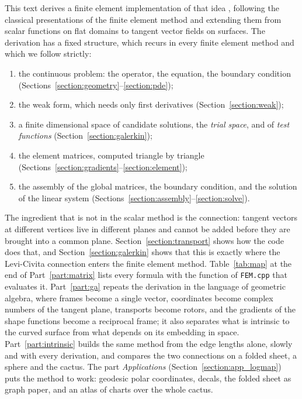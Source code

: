 \documentclass{birkjour}
\numberwithin{equation}{section}
\newcommand{\code}[1]{\texttt{#1}}
\begin{document}
This text derives a finite element implementation of that idea \cite{ConnectionLaplacianFEM}, following the classical presentations of the finite element method \cite{Sayas2015, Langtangen2014} and extending them from scalar functions on flat domains to tangent vector fields on surfaces. The derivation has a fixed structure, which recurs in every finite element method and which we follow strictly:
\begin{enumerate}
\item the continuous problem: the operator, the equation, the boundary condition (Sections~\ref{section:geometry}--\ref{section:pde});
\item the weak form, which needs only first derivatives (Section~\ref{section:weak});
\item a finite dimensional space of candidate solutions, the \emph{trial space}, and of \emph{test functions} (Section~\ref{section:galerkin});
\item the element matrices, computed triangle by triangle (Sections~\ref{section:gradients}--\ref{section:element});
\item the assembly of the global matrices, the boundary condition, and the solution of the linear system (Sections~\ref{section:assembly}--\ref{section:solve}).
\end{enumerate}
The ingredient that is not in the scalar method is the connection: tangent vectors at different vertices live in different planes and cannot be added before they are brought into a common plane. Section~\ref{section:transport} shows how the code does that, and Section~\ref{section:galerkin} shows that this is exactly where the Levi-Civita connection enters the finite element method. Table~\ref{tab:map} at the end of Part~\ref{part:matrix} lists every formula with the function of \code{FEM.cpp} that evaluates it. Part~\ref{part:ga} repeats the derivation in the language of geometric algebra, where frames become a single vector, coordinates become complex numbers of the tangent plane, transports become rotors, and the gradients of the shape functions become a reciprocal frame; it also separates what is intrinsic to the curved surface from what depends on its embedding in space. Part~\ref{part:intrinsic} builds the same method from the edge lengths alone, slowly and with every derivation, and compares the two connections on a folded sheet, a sphere and the cactus. The part \emph{Applications} (Section~\ref{section:app_logmap}) puts the method to work: geodesic polar coordinates, decals, the folded sheet as graph paper, and an atlas of charts over the whole cactus.
\end{document}
